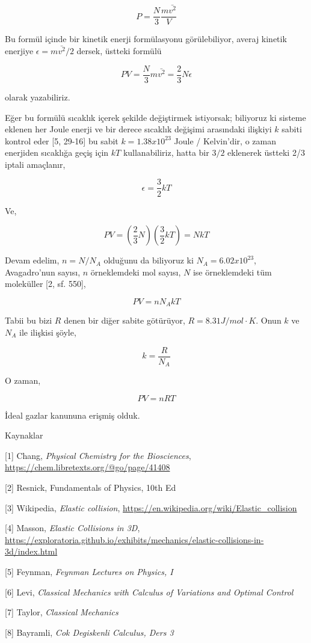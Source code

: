 \documentclass[12pt,fleqn]{article}\usepackage{../../common}
\begin{document}
$$
P = \frac{N}{3} \frac{m \bar{v^2}}{V}
$$

Bu formül içinde bir kinetik enerji formülasyonu görülebiliyor, averaj kinetik
enerjiye $\epsilon = m \bar{v^2} / 2$ dersek, üstteki formülü

$$
PV = \frac{N}{3} m \bar{v^2} = \frac{2}{3} N \epsilon
$$

olarak yazabiliriz.

Eğer bu formülü sıcaklık içerek şekilde değiştirmek istiyorsak; biliyoruz ki
sisteme eklenen her Joule enerji ve bir derece sıcaklık değişimi arasındaki
ilişkiyi $k$ sabiti kontrol eder [5, 29-16] bu sabit $k = 1.38 x 10^{23}$ Joule
/ Kelvin'dir, o zaman enerjiden sıcaklığa geçiş için $kT$ kullanabiliriz, hatta
bir $3/2$ eklenerek üstteki 2/3 iptali amaçlanır,

$$
\epsilon = \frac{3}{2} k T
$$

Ve,

$$
PV = \left( \frac{2}{3} N \right) \left( \frac{3}{2} k T \right) = N k T
$$

Devam edelim, $n = N / N_A$ olduğunu da biliyoruz ki $N_A = 6.02 x 10^{23}$,
Avagadro'nun sayısı, $n$ örneklemdeki mol sayısı, $N$ ise örneklemdeki tüm
moleküller [2, sf. 550],

$$
PV = n N_A k T
$$

Tabii bu bizi $R$ denen bir diğer sabite götürüyor, $R = 8.31 J/mol \cdot
K$. Onun $k$ ve $N_A$ ile ilişkisi şöyle,

$$
k = \frac{R}{N_A}
$$

O zaman,

$$
PV = n R T
$$

İdeal gazlar kanununa erişmiş olduk.

Kaynaklar

[1] Chang, {\em Physical Chemistry for the Biosciences},
    \url{https://chem.libretexts.org/@go/page/41408}

[2] Resnick, Fundamentals of Physics, 10th Ed

[3] Wikipedia, {\em Elastic collision}, \url{https://en.wikipedia.org/wiki/Elastic_collision}

[4] Masson, {\em Elastic Collisions in 3D}, \url{https://exploratoria.github.io/exhibits/mechanics/elastic-collisions-in-3d/index.html}

[5] Feynman, {\em Feynman Lectures on Physics, I}

[6] Levi, {\em Classical Mechanics with Calculus of Variations and Optimal Control}

[7] Taylor, {\em Classical Mechanics}

[8] Bayramli, {\em Cok Degiskenli Calculus, Ders 3}
\end{document}
